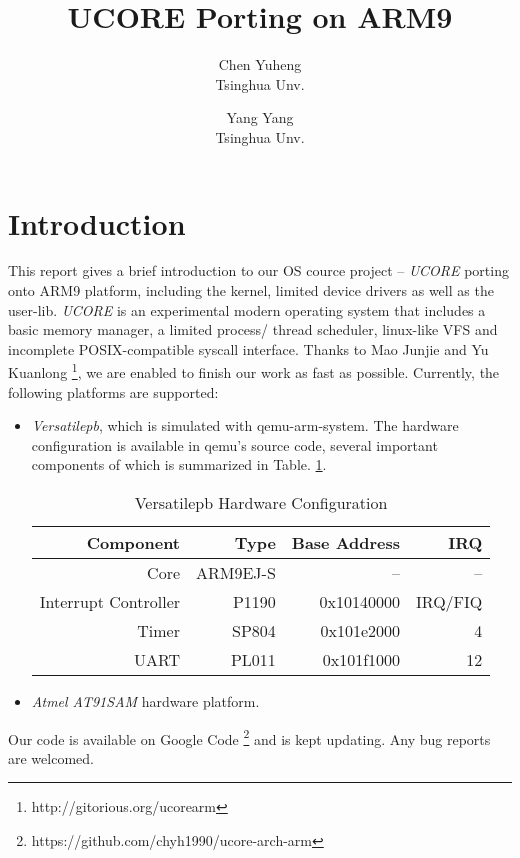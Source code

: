 \documentclass[a4paper]{article}
\begin{document}
\title{UCORE Porting on ARM9}
\author{Chen Yuheng\\ Tsinghua Unv. \and Yang Yang\\ Tsinghua Unv.}
\maketitle

\section{Introduction}
This report gives a brief introduction to our OS cource project -- 
\emph{UCORE} porting onto ARM9 platform, including the kernel, limited
device drivers as well as the user-lib. \emph{UCORE} is an experimental 
modern operating system that includes a basic memory manager, a limited process/
thread scheduler, linux-like VFS and incomplete POSIX-compatible syscall 
interface. Thanks to Mao Junjie
 and Yu Kuanlong
\footnote{http://gitorious.org/ucorearm}, we are enabled to finish our
 work as fast as possible. Currently, the following platforms are supported:
 \begin{itemize}
   \item \emph{Versatilepb}, which is simulated with qemu-arm-system.
     The hardware configuration is available in qemu's source code,
     several important components of which is summarized in
     Table. \ref{tab:versatile1}.
     \begin{table}[h]
       \centering
       \begin{tabular}{|r|rrr|}
         \hline
         Component & Type & Base Address &  IRQ \\
         \hline
         Core     &  ARM9EJ-S & -- & -- \\
         Interrupt Controller & P1190 & 0x10140000 & IRQ/FIQ \\
         Timer    &  SP804    & 0x101e2000 & 4 \\
         UART     &  PL011  & 0x101f1000 & 12  \\
         \hline
       \end{tabular}
       \caption{Versatilepb Hardware Configuration}
       \label{tab:versatile1}
     \end{table}

   \item \emph{Atmel AT91SAM} hardware platform.
 \end{itemize}

Our code is available on Google Code
\footnote{https://github.com/chyh1990/ucore-arch-arm}
 and is kept updating. Any bug reports are welcomed.
\end{document}
